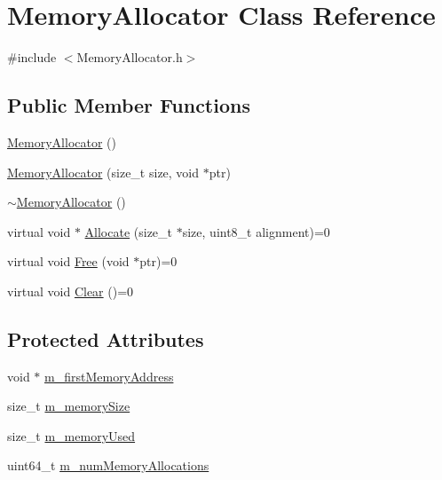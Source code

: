 \hypertarget{class_memory_allocator}{}\section{Memory\+Allocator Class Reference}
\label{class_memory_allocator}


{\ttfamily \#include $<$Memory\+Allocator.\+h$>$}

\subsection*{Public Member Functions}
\begin{DoxyCompactItemize}
\item 
\mbox{\hyperlink{class_memory_allocator_aeb408be3b4170052a477bd917bfba8a4}{Memory\+Allocator}} ()
\item 
\mbox{\hyperlink{class_memory_allocator_ad1f08b45facfce42c5103f726eb4e6d5}{Memory\+Allocator}} (size\+\_\+t size, void $\ast$ptr)
\item 
\mbox{\hyperlink{class_memory_allocator_a29649a1c897a6edca2a223ee9a100f34}{$\sim$\+Memory\+Allocator}} ()
\item 
virtual void $\ast$ \mbox{\hyperlink{class_memory_allocator_aa56c860aa8027554aa9bd6d7c9780a67}{Allocate}} (size\+\_\+t $\ast$size, uint8\+\_\+t alignment)=0
\item 
virtual void \mbox{\hyperlink{class_memory_allocator_ae6ee38cd52e3e0710251b4e3eb550c6d}{Free}} (void $\ast$ptr)=0
\item 
virtual void \mbox{\hyperlink{class_memory_allocator_a204e81d93d93f1db39e134b956422e56}{Clear}} ()=0
\end{DoxyCompactItemize}
\subsection*{Protected Attributes}
\begin{DoxyCompactItemize}
\item 
void $\ast$ \mbox{\hyperlink{class_memory_allocator_a62ec2c2ef91d62f61e630c75844b1279}{m\+\_\+first\+Memory\+Address}}
\item 
size\+\_\+t \mbox{\hyperlink{class_memory_allocator_a219f6c1d24a8a556f4d1ec1bb0b11171}{m\+\_\+memory\+Size}}
\item 
size\+\_\+t \mbox{\hyperlink{class_memory_allocator_a5961e1f05827593c67b17094ff8007bf}{m\+\_\+memory\+Used}}
\item 
uint64\+\_\+t \mbox{\hyperlink{class_memory_allocator_a0fbd7580dfb92e7e5ba20c44658df574}{m\+\_\+num\+Memory\+Allocations}}
\end{DoxyCompactItemize}


